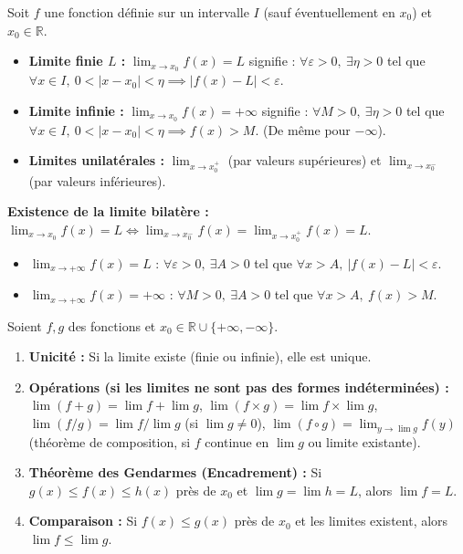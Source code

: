 \documentclass[11pt]{article}
\begin{document}
\begin{definition}
    Soit $f$ une fonction définie sur un intervalle $I$ (sauf éventuellement en $x_0$) et $x_0 \in \mathbb{R}$.
    \begin{itemize}
        \item \textbf{Limite finie $L$ :} $\lim_{x\to x_0} f(x) = L$ signifie : $\forall \varepsilon > 0,\ \exists \eta > 0$ tel que $\forall x \in I,\ 0 < |x-x_0| < \eta \implies |f(x)-L| < \varepsilon$.
        \item \textbf{Limite infinie :} $\lim_{x\to x_0} f(x) = +\infty$ signifie : $\forall M > 0,\ \exists \eta > 0$ tel que $\forall x \in I,\ 0 < |x-x_0| < \eta \implies f(x) > M$. (De même pour $-\infty$).
        \item \textbf{Limites unilatérales :} $\lim_{x\to x_0^+}$ (par valeurs supérieures) et $\lim_{x\to x_0^-}$ (par valeurs inférieures).
    \end{itemize}
    \textbf{Existence de la limite bilatère :} $\lim_{x\to x_0} f(x) = L \iff \lim_{x\to x_0^-} f(x) = \lim_{x\to x_0^+} f(x) = L$.
\end{definition}

\begin{definition}
    \begin{itemize}
        \item $\lim_{x\to +\infty} f(x) = L$ : $\forall \varepsilon > 0,\ \exists A > 0$ tel que $\forall x > A,\ |f(x)-L| < \varepsilon$.
        \item $\lim_{x\to +\infty} f(x) = +\infty$ : $\forall M > 0,\ \exists A > 0$ tel que $\forall x > A,\ f(x) > M$.
    \end{itemize}
\end{definition}

\begin{propriete}
    Soient $f,g$ des fonctions et $x_0 \in \mathbb{R} \cup \{+\infty, -\infty\}$.
    \begin{enumerate}
        \item \textbf{Unicité :} Si la limite existe (finie ou infinie), elle est unique.
        \item \textbf{Opérations (si les limites ne sont pas des formes indéterminées) :}
              $\lim (f+g) = \lim f + \lim g$,
              $\lim (f \times g) = \lim f \times \lim g$,
              $\lim (f/g) = \lim f / \lim g$ (si $\lim g \neq 0$),
              $\lim (f \circ g) = \lim_{y\to \lim g} f(y)$ (théorème de composition, si $f$ continue en $\lim g$ ou limite existante).
        \item \textbf{Théorème des Gendarmes (Encadrement) :} Si $g(x) \le f(x) \le h(x)$ près de $x_0$ et $\lim g = \lim h = L$, alors $\lim f = L$.
        \item \textbf{Comparaison :} Si $f(x) \le g(x)$ près de $x_0$ et les limites existent, alors $\lim f \le \lim g$.
    \end{enumerate}
\end{propriete}
\end{document}
